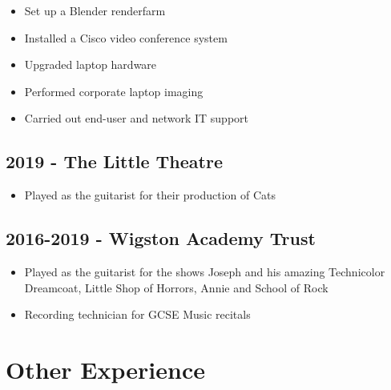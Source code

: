 \documentclass{article}
\begin{document}

\begin{itemize}[noitemsep]

\item Set up a Blender renderfarm
\item Installed a Cisco video conference system 
\item Upgraded laptop hardware
\item Performed corporate laptop imaging
\item Carried out end-user and network IT support

\end{itemize}

\subsection{2019 - The Little Theatre}
\begin{itemize}[noitemsep]

\item Played as the guitarist for their production of Cats

\end{itemize}


\subsection{2016-2019 - Wigston Academy Trust}
\begin{itemize}[noitemsep]

\item Played as the guitarist for the shows Joseph and his amazing Technicolor Dreamcoat, Little Shop of Horrors, Annie and School of Rock
\item Recording technician for GCSE Music recitals

\end{itemize}


\section{Other Experience}
\end{document}
